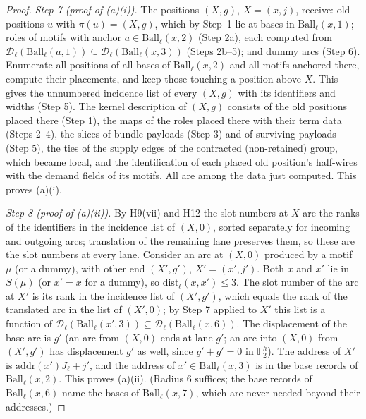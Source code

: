 \documentclass[11pt]{article}
\theoremstyle{definition}
\theoremstyle{remark}
\newcommand{\F}{\mathbb F}
\newcommand{\Ball}{\mathrm{Ball}}
\begin{document}
\begin{proof}
\emph{Step 7 (proof of (a)(i)).} The positions $(X,g)$, $X=(x,j)$, receive: old positions $u$ with $\pi(u)=(X,g)$, which by
Step~1 lie at bases in $\Ball_\ell(x,1)$; roles of motifs with anchor $a\in\Ball_\ell(x,2)$ (Step 2a), each computed from
$\mathcal D_\ell(\Ball_\ell(a,1))\subseteq\mathcal D_\ell(\Ball_\ell(x,3))$ (Steps 2b--5); and dummy arcs (Step 6). Enumerate all
positions of all bases of $\Ball_\ell(x,2)$ and all motifs anchored there, compute their placements, and keep those touching a
position above $X$. This gives the unnumbered incidence list of every $(X,g)$ with its identifiers and widths (Step 5). The kernel
description of $(X,g)$ consists of the old positions placed there (Step 1), the maps of the roles placed there with their term
data (Steps 2--4), the slices of bundle payloads (Step 3) and of surviving payloads (Step 5), the ties of the supply edges of the
contracted (non-retained) group, which became local, and the identification of each placed old position's half-wires with the demand fields of its
motifs. All are among the data just computed. This proves (a)(i).

\emph{Step 8 (proof of (a)(ii)).} By H9(vii) and H12 the slot numbers at $X$ are the ranks of the identifiers in the incidence
list of $(X,0)$, sorted separately for incoming and outgoing arcs; translation of the remaining lane preserves them, so these are
the slot numbers at every lane. Consider an arc at $(X,0)$ produced by a motif $\mu$ (or a dummy), with other end $(X',g')$,
$X'=(x',j')$. Both $x$ and $x'$ lie in $S(\mu)$ (or $x'=x$ for a dummy), so $\mathrm{dist}_\ell(x,x')\le3$. The slot number of the
arc at $X'$ is its rank in the incidence list of $(X',g')$, which equals the rank of the translated arc in the list of $(X',0)$;
by Step 7 applied to $X'$ this list is a function of $\mathcal D_\ell(\Ball_\ell(x',3))\subseteq\mathcal D_\ell(\Ball_\ell(x,6))$.
The displacement of the base arc is $g'$ (an arc from $(X,0)$ ends at lane $g'$; an arc into $(X,0)$ from $(X',g')$ has
displacement $g'$ as well, since $g'+g'=0$ in $\F_2^h$). The address of $X'$ is $\mathrm{addr}(x')J_\ell+j'$, and the address of
$x'\in\Ball_\ell(x,3)$ is in the base records of $\Ball_\ell(x,2)$. This proves (a)(ii). (Radius $6$ suffices; the base records of
$\Ball_\ell(x,6)$ name the bases of $\Ball_\ell(x,7)$, which are never needed beyond their addresses.)


\end{proof}
\end{document}
